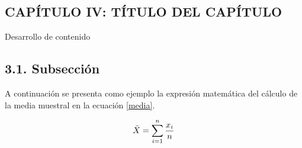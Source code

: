 \medspace
\vspace{1.5cm}
\begin{center}
	\section*{\large CAPÍTULO IV: TÍTULO DEL CAPÍTULO}
\end{center}

\vspace{1cm}

Desarrollo de contenido
\subsection*{\normalsize 3.1. Subsección}

A continuación se presenta como ejemplo la expresión matemática del cálculo de la media muestral en la ecuación \ref{media}.

\begin{equation}
\label{media}
	\LARGE
	\bar{X} = \sum_{i = 1}^{n} \frac{x_i}{n}
\end{equation}

